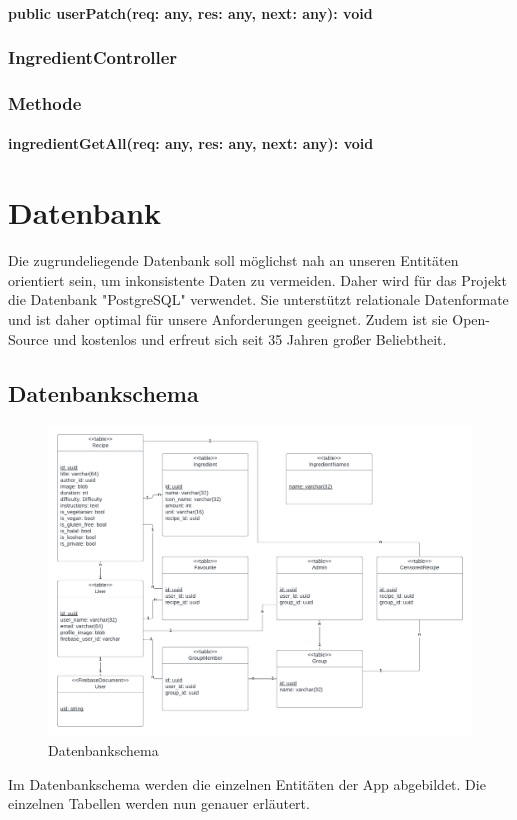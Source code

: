 \documentclass[parskip=full]{scrartcl}
\begin{document}
\paragraph{public userPatch(req: any, res: any, next: any): void}

\subsubsection{IngredientController}
\subsubsection*{Methode}
\paragraph{ingredientGetAll(req: any, res: any, next: any): void}

\newpage

\section{Datenbank}
Die zugrundeliegende Datenbank soll möglichst nah an unseren Entitäten orientiert sein, um inkonsistente Daten zu vermeiden. Daher wird für das Projekt die Datenbank "PostgreSQL" verwendet. Sie unterstützt relationale Datenformate und ist daher optimal für unsere Anforderungen geeignet. Zudem ist sie Open-Source und kostenlos und erfreut sich seit 35 Jahren großer Beliebtheit.
\subsection{Datenbankschema}
\begin{figure}[htp]
    \centering
    \includegraphics[width = \linewidth]{images/Database/schema.png}
    \caption{Datenbankschema}
\end{figure}
Im Datenbankschema werden die einzelnen Entitäten der App abgebildet. Die einzelnen Tabellen werden nun genauer erläutert.
\newpage
\end{document}
